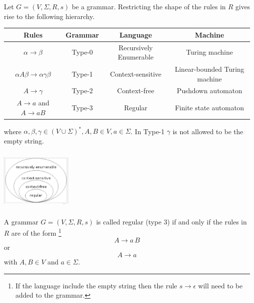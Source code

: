 \documentclass[a4paper,blends,pdf,colorBG,slideColor]{prosper}
\begin{document}

\scriptsize
Let $G = (V,\Sigma,R,s)$ be a grammar.  Restricting the shape of the rules in $R$ gives rise to the following hierarchy.

\begin{table}[htdp]
\begin{center}
{\tiny
\begin{tabular}{|c|c|c|c|}
Rules & Grammar & Language & Machine \\ \hline
$\alpha \rightarrow \beta$ & Type-0 & Recursively Enumerable & Turing machine \\
$\alpha A \beta \rightarrow \alpha\gamma\beta$  & Type-1 & Context-sensitive & Linear-bounded Turing machine\\
$A  \rightarrow \gamma$  & Type-2 & Context-free & Pushdown automaton\\
$A \rightarrow a$ and $A \rightarrow a B$ & Type-3 & Regular & Finite state automaton
\end{tabular}
}
\end{center}
\label{default}
\end{table}%
where $\alpha,\beta,\gamma\in (V \cup \Sigma)^*, A,B \in V, a\in \Sigma$.
In Type-1 $\gamma$ is not allowed to be the empty string.

\vspace{.1in}
\begin{center}
    \includegraphics[height=30mm,width=35mm]{images/chomsky-hierarchy}
\end{center}


\es




A grammar $G = (V,\Sigma,R,s)$ is called regular (type 3) if and only if the rules in $R$ are of the form
\footnote{If the language include the empty string then the rule $s \rightarrow \epsilon$ will need to be added 
to the grammar.} 
\[
A \rightarrow a\, B
\]
or 
\[
A \rightarrow a
\]
with $A,B \in V$ and $a\in\Sigma$.
\es

\end{document}
